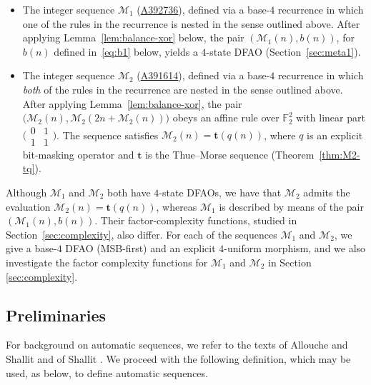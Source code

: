 \documentclass[12pt,reqno]{article}
\newcommand{\seqnum}[1]{\href{https://oeis.org/#1}{\rm \underline{#1}}}
\theoremstyle{plain}
\theoremstyle{definition}
\theoremstyle{remark}
\begin{document}
\begin{itemize}

 \item The integer sequence $\mathcal{M}_{1}$ (\seqnum{A392736}), defined via a base-$4$ recurrence in which one of the rules in 
 the recurrence is nested in the 
 sense outlined above. After applying Lemma~\ref{lem:balance-xor} below,
 the pair $(\mathcal{M}_{1}(n), b(n))$, for $b(n)$ defined in~\eqref{eq:b1} below, yields a $4$-state DFAO
 (Section~\ref{sec:meta1}).

\item The integer sequence $\mathcal{M}_{2}$ (\seqnum{A391614}), defined via a base-$4$ recurrence in which \emph{both} of the rules 
 in the recurrence are nested in the sense outlined above. After applying Lemma~\ref{lem:balance-xor}, the pair
 $\bigl(\mathcal{M}_{2}(n),\mathcal{M}_{2}(2n+\mathcal{M}_{2}(n))\bigr)$ obeys an affine
 rule over $\mathbb{F}_2^2$ with linear part
 $\bigl(\begin{smallmatrix}0 & 1\\1&1\end{smallmatrix}\bigr)$. The sequence satisfies
 $\mathcal{M}_{2}(n) = \mathbf{t}(q(n))$, where $q$ is an explicit bit-masking operator
 and $\mathbf{t}$ is the Thue--Morse sequence (Theorem~\ref{thm:M2-tq}).

\end{itemize}

 Although $\mathcal{M}_{1}$ and $\mathcal{M}_{2}$ both have $4$-state DFAOs, we have that $\mathcal{M}_{2}$ admits the evaluation 
 $\mathcal{M}_{2}(n) = \mathbf{t}(q(n))$, whereas $\mathcal{M}_{1}$ is described by means of the pair $(\mathcal{M}_{1}(n), b(n))$. 
 Their factor-complexity functions, studied in Section~\ref{sec:complexity}, also differ. For each of the sequences $\mathcal{M}_{1}$ and 
 $\mathcal{M}_{2}$, we give a base-$4$ DFAO (MSB-first) and an explicit $4$-uniform morphism, 
 and we also investigate the factor complexity functions for $\mathcal{M}_{1}$ and $\mathcal{M}_{2}$
 in Section \ref{sec:complexity}. 

 \subsection{Preliminaries}\label{subsectionpre} 
 For background on automatic sequences, we refer to the texts of Allouche and Shallit \cite{AlloucheShallit2003}
 and of Shallit \cite{Shallit2022}. We proceed with the following 
 definition, which may be used, as below, to define automatic sequences. 
\end{document}
